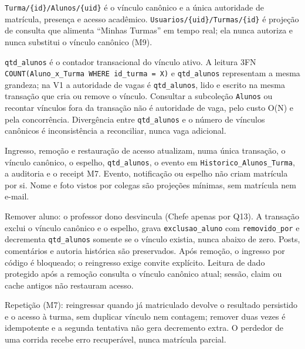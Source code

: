 \begin{regra}
\texttt{Turma/\{id\}/Alunos/\{uid\}} é o vínculo canônico e a única autoridade
de matrícula, presença e acesso acadêmico. \texttt{Usuarios/\{uid\}/Turmas/\{id\}}
é projeção de consulta que alimenta ``Minhas Turmas'' em tempo real; ela nunca
autoriza e nunca substitui o vínculo canônico (M9).

\texttt{qtd\_alunos} é o contador transacional do vínculo ativo. A leitura 3FN
\texttt{COUNT(Aluno\_x\_Turma WHERE id\_turma = X)} e \texttt{qtd\_alunos}
representam a mesma grandeza; na V1 a autoridade de vagas é
\texttt{qtd\_alunos}, lido e escrito na mesma transação que cria ou remove o
vínculo. Consultar a subcoleção \texttt{Alunos} ou recontar vínculos fora da
transação não é autoridade de vaga, pelo custo O(N) e pela concorrência.
Divergência entre \texttt{qtd\_alunos} e o número de vínculos canônicos é
inconsistência a reconciliar, nunca vaga adicional.

Ingresso, remoção e restauração de acesso atualizam, numa única transação, o
vínculo canônico, o espelho, \texttt{qtd\_alunos}, o evento em
\texttt{Historico\_Alunos\_Turma}, a auditoria e o receipt M7. Evento,
notificação ou espelho não criam matrícula por si. Nome e foto vistos por
colegas são projeções mínimas, sem matrícula nem e-mail.

Remover aluno: o professor dono desvincula (Chefe apenas por Q13). A transação
exclui o vínculo canônico e o espelho, grava \texttt{exclusao\_aluno} com
\texttt{removido\_por} e decrementa \texttt{qtd\_alunos} somente se o vínculo
existia, nunca abaixo de zero. Posts, comentários e autoria histórica são
preservados. Após remoção, o ingresso por código é bloqueado; o reingresso
exige convite explícito. Leitura de dado protegido após a remoção consulta o
vínculo canônico atual; sessão, claim ou cache antigos não restauram acesso.

Repetição (M7): reingressar quando já matriculado devolve o resultado
persistido e o acesso à turma, sem duplicar vínculo nem contagem; remover duas
vezes é idempotente e a segunda tentativa não gera decremento extra. O perdedor
de uma corrida recebe erro recuperável, nunca matrícula parcial.
\end{regra}

